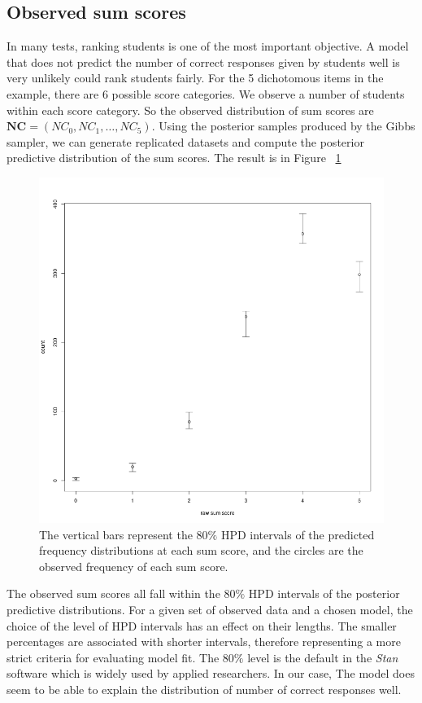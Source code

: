 \documentclass[floatsintext, man]{apa7}
\begin{document}
\subsection{Observed sum scores}
In many tests, ranking students is one of the most important objective. A model
that does not predict the number of correct responses given by students well is
very unlikely could rank students fairly. For the 5 dichotomous items in the
example, there are 6 possible score categories. We observe a number of students
within each score category. So the observed distribution of sum scores are $
\bm{NC}=(NC_0, NC_1, \dots, NC_5)$. Using the posterior samples produced by the
Gibbs sampler, we can generate replicated datasets and compute the posterior
predictive distribution of the sum scores. The result is in Figure~
\ref{fig:ppmc_raw_scores}
\begin{figure}[t]
\centering
  \includegraphics[scale=0.4]{Fig/raw_score_coverage.png}
  \caption{The vertical bars represent the $80\%$ HPD intervals of the predicted
  frequency distributions at each sum score, and the circles are the observed
  frequency of each sum score.}
  \label{fig:ppmc_raw_scores}
\end{figure}
The observed sum scores all fall within the $80\%$ HPD intervals of the posterior
predictive distributions. For a given set of observed data and a chosen
model, the choice of the level of HPD intervals has an effect on their
lengths. The smaller percentages are associated with shorter intervals,
therefore representing a more strict criteria for evaluating model fit. The
$80\%$ level is the default in the \textit{Stan} software which is widely used
by applied researchers. In our case, The model does seem to be able to explain
the distribution of number of correct responses well.
\end{document}
